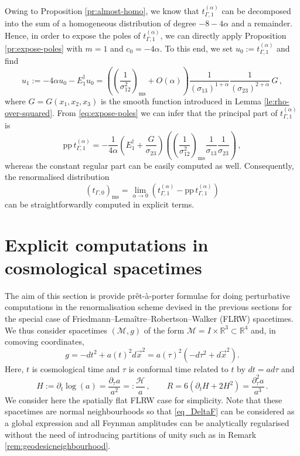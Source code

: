 \documentclass[a4paper,10pt,twoside]{article}
\numberwithin{equation}{section}
\newcounter{and}
\def\bbR{\mathbb{R}}
\def\M{\mathcal{M}}
\def\H{\mathcal{H}}
\def\pp{\mathrm{pp}}
\def\ms{\mathrm{ms}}
\def\beq{\begin{equation}}
\def\eeq{\end{equation}}
\theoremstyle{plain}
\theoremstyle{definition}
\begin{document}
Owing to Proposition \ref{pr:almost-homo}, we know that $t_{\Gamma,1}^{(\alpha)}$ can be decomposed into the sum of a homogeneous distribution of degree $-8-4\alpha$ and a remainder. Hence, in order to expose the poles of $t_{\Gamma,1}^{(\alpha)}$,    
we can directly apply Proposition \ref{pr:expose-poles} with $m=1$ and $c_0 = -4\alpha$. To this end, we set $u_0 := t_{\Gamma,1}^{(\alpha)}$ 
and find 
\[
u_1 := -4\alpha u_0 - E^\dagger_1 u_0   = \left(\left(\frac{1}{\sigma_{12}^{2}} \right)_\ms + O(\alpha) \right) \frac{1}{(\sigma_{13})^{1+\alpha}} \frac{1}{(\sigma_{23})^{2+\alpha}} \,G\,,
\]
where $G=G(x_1,x_2,x_3)$ is the smooth function introduced in Lemma \ref{le:rho-over-squared}. 
From \eqref{eq:expose-poles} we can infer that the principal part of $t_{\Gamma,1}^{(\alpha)}$ is
\[
\pp \,t_{\Gamma,1}^{(\alpha)} = -\frac{1}{4\alpha} \left(E^\dagger_1 +\frac{G}{\sigma_{23}}\right) \left( \left(\frac{1}{\sigma_{12}^2}\right)_\ms\frac{1}{\sigma_{13}} \frac{1}{\sigma_{23}}\right)\,,
\]
whereas the constant regular part can be easily computed as well. Consequently, the renormalised distribution
\[
(t_{\Gamma,0})_\ms = \lim_{\alpha\to 0} \left( t_{\Gamma,1}^{(\alpha)} - \pp \,t_{\Gamma,1}^{(\alpha)}   \right)
\]
can be straightforwardly computed in explicit terms.






\section{Explicit computations in cosmological spacetimes}
\label{sec_FRW}

The aim of this section is provide pr\^et-\`a-porter formulae for doing perturbative computations in the renormalisation scheme devised in the previous sections for the special case of Friedmann--Lema\^itre--Robertson--Walker (FLRW) spacetimes. We thus consider spacetimes $(\M,g)$ of the form $\M=I\times \bbR^3\subset \bbR^4$ and, in comoving coordinates,
$$g= -dt^2 + a(t)^2 d\vec{x}^2=a(\tau)^2\left(-d\tau^2+d\vec{x}^2\right).$$
Here, $t$ is cosmological time and $\tau$ is conformal time related to $t$ by $dt = a d\tau$ and 
\beq\label{eq_RFLRW} H:=\partial_t \log (a) = \frac{\partial_\tau a}{a^2}=:\frac{\H}{a}\,,\qquad R=6(\partial_t H + 2 H^2)=\frac{\partial^2_\tau a}{a^3}\,.\eeq
We consider here the spatially flat FLRW case for simplicity. Note that these spacetimes are normal neighbourhoods so that \eqref{eq_DeltaF} can be considered as a global expression and all Feynman amplitudes can be analytically regularised without the need of introducing partitions of unity such as in Remark \ref{rem:geodesicneighbourhood}.
\end{document}
